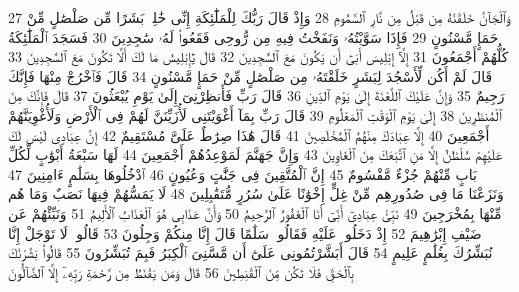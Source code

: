 {\tiny\colorbox{cl_aya}{27}} وَٱلْجَآنَّ خَلَقْنَٰهُ مِن قَبْلُ مِن نَّارِ ٱلسَّمُومِ
{\tiny\colorbox{cl_aya}{28}} وَإِذْ قَالَ رَبُّكَ لِلْمَلَٰٓئِكَةِ إِنِّى خَٰلِقٌۢ بَشَرًا مِّن صَلْصَٰلٍ مِّنْ حَمَإٍ مَّسْنُونٍ
{\tiny\colorbox{cl_aya}{29}} فَإِذَا سَوَّيْتُهُۥ وَنَفَخْتُ فِيهِ مِن رُّوحِى فَقَعُوا۟ لَهُۥ سَٰجِدِينَ
{\tiny\colorbox{cl_aya}{30}} فَسَجَدَ ٱلْمَلَٰٓئِكَةُ كُلُّهُمْ أَجْمَعُونَ
{\tiny\colorbox{cl_aya}{31}} إِلَّآ إِبْلِيسَ أَبَىٰٓ أَن يَكُونَ مَعَ ٱلسَّٰجِدِينَ
{\tiny\colorbox{cl_aya}{32}} قَالَ يَٰٓإِبْلِيسُ مَا لَكَ أَلَّا تَكُونَ مَعَ ٱلسَّٰجِدِينَ
{\tiny\colorbox{cl_aya}{33}} قَالَ لَمْ أَكُن لِّأَسْجُدَ لِبَشَرٍ خَلَقْتَهُۥ مِن صَلْصَٰلٍ مِّنْ حَمَإٍ مَّسْنُونٍ
{\tiny\colorbox{cl_aya}{34}} قَالَ فَٱخْرُجْ مِنْهَا فَإِنَّكَ رَجِيمٌ
{\tiny\colorbox{cl_aya}{35}} وَإِنَّ عَلَيْكَ ٱللَّعْنَةَ إِلَىٰ يَوْمِ ٱلدِّينِ
{\tiny\colorbox{cl_aya}{36}} قَالَ رَبِّ فَأَنظِرْنِىٓ إِلَىٰ يَوْمِ يُبْعَثُونَ
{\tiny\colorbox{cl_aya}{37}} قَالَ فَإِنَّكَ مِنَ ٱلْمُنظَرِينَ
{\tiny\colorbox{cl_aya}{38}} إِلَىٰ يَوْمِ ٱلْوَقْتِ ٱلْمَعْلُومِ
{\tiny\colorbox{cl_aya}{39}} قَالَ رَبِّ بِمَآ أَغْوَيْتَنِى لَأُزَيِّنَنَّ لَهُمْ فِى ٱلْأَرْضِ وَلَأُغْوِيَنَّهُمْ أَجْمَعِينَ
{\tiny\colorbox{cl_aya}{40}} إِلَّا عِبَادَكَ مِنْهُمُ ٱلْمُخْلَصِينَ
{\tiny\colorbox{cl_aya}{41}} قَالَ هَٰذَا صِرَٰطٌ عَلَىَّ مُسْتَقِيمٌ
{\tiny\colorbox{cl_aya}{42}} إِنَّ عِبَادِى لَيْسَ لَكَ عَلَيْهِمْ سُلْطَٰنٌ إِلَّا مَنِ ٱتَّبَعَكَ مِنَ ٱلْغَاوِينَ
{\tiny\colorbox{cl_aya}{43}} وَإِنَّ جَهَنَّمَ لَمَوْعِدُهُمْ أَجْمَعِينَ
{\tiny\colorbox{cl_aya}{44}} لَهَا سَبْعَةُ أَبْوَٰبٍ لِّكُلِّ بَابٍ مِّنْهُمْ جُزْءٌ مَّقْسُومٌ
{\tiny\colorbox{cl_aya}{45}} إِنَّ ٱلْمُتَّقِينَ فِى جَنَّٰتٍ وَعُيُونٍ
{\tiny\colorbox{cl_aya}{46}} ٱدْخُلُوهَا بِسَلَٰمٍ ءَامِنِينَ
{\tiny\colorbox{cl_aya}{47}} وَنَزَعْنَا مَا فِى صُدُورِهِم مِّنْ غِلٍّ إِخْوَٰنًا عَلَىٰ سُرُرٍ مُّتَقَٰبِلِينَ
{\tiny\colorbox{cl_aya}{48}} لَا يَمَسُّهُمْ فِيهَا نَصَبٌ وَمَا هُم مِّنْهَا بِمُخْرَجِينَ
{\tiny\colorbox{cl_aya}{49}} نَبِّئْ عِبَادِىٓ أَنِّىٓ أَنَا ٱلْغَفُورُ ٱلرَّحِيمُ
{\tiny\colorbox{cl_aya}{50}} وَأَنَّ عَذَابِى هُوَ ٱلْعَذَابُ ٱلْأَلِيمُ
{\tiny\colorbox{cl_aya}{51}} وَنَبِّئْهُمْ عَن ضَيْفِ إِبْرَٰهِيمَ
{\tiny\colorbox{cl_aya}{52}} إِذْ دَخَلُوا۟ عَلَيْهِ فَقَالُوا۟ سَلَٰمًا قَالَ إِنَّا مِنكُمْ وَجِلُونَ
{\tiny\colorbox{cl_aya}{53}} قَالُوا۟ لَا تَوْجَلْ إِنَّا نُبَشِّرُكَ بِغُلَٰمٍ عَلِيمٍ
{\tiny\colorbox{cl_aya}{54}} قَالَ أَبَشَّرْتُمُونِى عَلَىٰٓ أَن مَّسَّنِىَ ٱلْكِبَرُ فَبِمَ تُبَشِّرُونَ
{\tiny\colorbox{cl_aya}{55}} قَالُوا۟ بَشَّرْنَٰكَ بِٱلْحَقِّ فَلَا تَكُن مِّنَ ٱلْقَٰنِطِينَ
{\tiny\colorbox{cl_aya}{56}} قَالَ وَمَن يَقْنَطُ مِن رَّحْمَةِ رَبِّهِۦٓ إِلَّا ٱلضَّآلُّونَ
